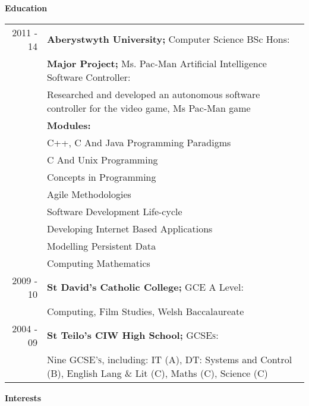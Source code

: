 \documentclass[a4paper,12pt,final,sans]{memoir}
\begin{document}
\vspace{-0.5mm}

\textbf{\textsf{\color{head} \large{Education} }}\\[-1.5em]
\begin{longtable}{r p{16cm}}
2011 - 14 & \textbf{\textsf{\color{head} Aberystwyth University;}} Computer Science BSc Hons:\\[0.3em]
		& \textbf{\color{subhead} Major Project;} Ms. Pac-Man Artificial Intelligence Software Controller:\\
		& Researched and developed an autonomous software controller for the video game, Ms Pac-Man game \\[0.2em]

		& \textbf{\color{subhead} Modules:}\\ 
		& \textsc{C++}, C And Java Programming Paradigms
		{}\\

		& C And Unix Programming
		{}\\

		& Concepts in Programming
		{}\\

		& Agile Methodologies
		{}\\

		& Software Development Life-cycle
		{}\\

		& Developing Internet Based Applications
		{}\\

		& Modelling Persistent Data
		{}\\

		& Computing Mathematics
		{}\\[0.5em]

2009 - 10 & \textbf{\textsf{\color{head} St David's Catholic College;}} GCE A Level:\\[0.3em]
		& Computing, Film Studies, Welsh Baccalaureate\\[0.5em]

2004 - 09 & \textbf{\textsf{\color{head} St Teilo's CIW High School;}} \textsc{GCSEs:}\\[0.3em]
	 & Nine \textsc{GCSE's}, including: \textsc{IT} (A), \textsc{DT}: Systems and Control (B), English Lang \& Lit (C), Maths (C), Science (C)
\end{longtable}

\vspace{1mm}
\textbf{\textsf{\color{head} \large{Interests} }} \\[-0.7em]
\end{document}
